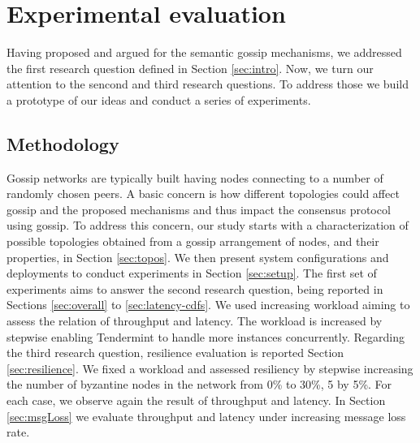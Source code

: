 \new
\section{Experimental evaluation}
\label{experiments}

Having proposed and argued for the semantic gossip mechanisms, we addressed the first research question defined in Section \ref{sec:intro}.   Now, we turn our attention to the 
sencond and third research questions.  To address those we build a prototype of our ideas and conduct a series of experiments.


\subsection{Methodology}
\label{ref:method}

Gossip networks are typically built having nodes connecting to a number of randomly chosen peers.
A basic concern is how different topologies 
could affect gossip and the proposed mechanisms and thus impact the consensus protocol using gossip.   To address this concern, our study starts with a characterization of possible topologies obtained from a gossip arrangement of nodes, and their properties, in Section \ref{sec:topos}.
%
We then present system configurations and deployments to conduct experiments in Section \ref{sec:setup}.
The first set of experiments aims to answer the second research question, being
reported in Sections \ref{sec:overall} to \ref{sec:latency-cdfs}. 
We used increasing workload 
aiming to assess the relation of throughput and latency.
The workload is increased by stepwise enabling Tendermint to handle more 
instances concurrently.
Regarding the third research question, resilience evaluation is reported Section \ref{sec:resilience}.  
We fixed a workload and assessed resiliency by 
stepwise increasing the number of byzantine nodes in the network from 0\% to 30\%, 5 by 5\%.   For each case, we observe again the result of throughput and latency.
In Section \ref{sec:msgLoss} we evaluate throughput and latency under increasing message loss rate.

